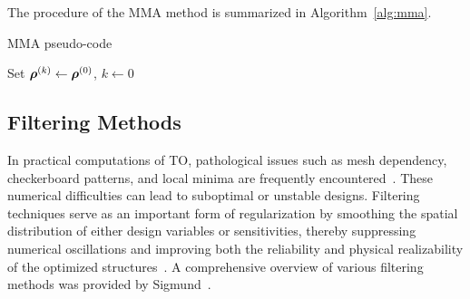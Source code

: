 \documentclass[mathpazo]{cicp}
\begin{document}
The procedure of the MMA method is summarized in Algorithm~\ref{alg:mma}.
\vspace{-0.5ex} %
\begin{algorithm}[H]
	\caption{MMA pseudo-code}
	\label{alg:mma}
	\begin{minipage}{\textwidth}
		Set $\boldsymbol{\rho}^{(k)} \leftarrow \boldsymbol{\rho}^{(0)}$, $k \leftarrow 0$\;
		
	\end{minipage}
\end{algorithm}
\vspace{-0.5ex} %

\subsection{Filtering Methods}
In practical computations of TO, pathological issues such as mesh dependency, checkerboard patterns, and local minima are frequently encountered~\cite{bendsoe2013topology}. These numerical difficulties can lead to suboptimal or unstable designs. Filtering techniques serve as an important form of regularization by smoothing the spatial distribution of either design variables or sensitivities, thereby suppressing numerical oscillations and improving both the reliability and physical realizability of the optimized structures~\cite{sigmund1998numerical}. A comprehensive overview of various filtering methods was provided by Sigmund~\cite{sigmund2007morphology}. 
\end{document}
